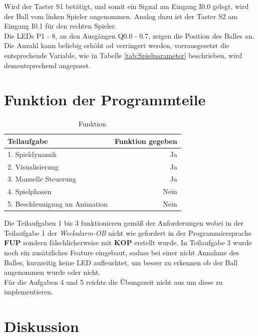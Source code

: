 \documentclass[a4paper]{article}
\begin{document}
     Wird der Taster S1 betätigt, und somit ein Signal am Eingang I0.0 gelegt, wird der Ball vom linken Spieler angenommen. Analog dazu ist der Taster S2 am Eingang I0.1 für den rechten Spieler.\\
     Die LEDs P1 - 8, an den Ausgängen Q0.0 - 0.7, zeigen die Position des Balles an. Die Anzahl kann beliebig erhöht od verringert werden, vorrausgesetzt die entsprechende Variable, wie in Tabelle \ref{tab:Spielparameter} beschrieben, wird dementsprechend angepasst. 

    \section{Funktion der Programmteile} %
    \begin{table}[h!]
        \begin{center}
          \begin{tabular}{|l|r|}
         \hline 
            \textbf{Teilaufgabe} & \textbf{Funktion gegeben}\\
            \hline
            1. Spieldynamik & Ja\\
            \hline
            2. Visualisierung & Ja\\
            \hline
            3. Manuelle Steuerung & Ja\\
            \hline
            4. Spielphasen & Nein\\
            \hline
            5. Beschleunigung un Animation & Nein\\
            \hline
          \end{tabular}
          \caption{Funktion}
          \label{tab:Funktion}
        \end{center}
      \end{table}

      Die Teilaufgaben 1 bis 3 funktionieren gemäß der Anforderungen wobei in der Teilaufgabe 1 der \textit{Weckalarm-OB} nicht wie gefordert in der Programmiersprache \textbf{FUP} sondern fälschlicherweise mit \textbf{KOP} erstellt wurde. In Teilaufgabe 3 wurde noch ein zusätzliches Feature eingebaut, sodass bei einer nicht Annahme des Balles, kurzzeitig keine LED aufleuchtet, um besser zu erkennen ob der Ball angenommen wurde oder nicht.\\
      Für die Aufgaben 4 und 5 reichte die Übungszeit nicht aus um diese zu implementieren.

    \section{Diskussion}
\end{document}
